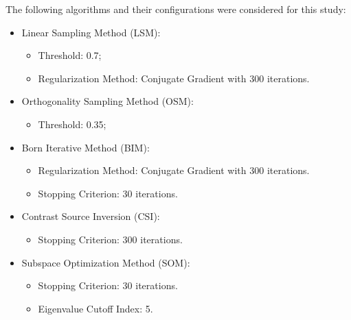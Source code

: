 \documentclass{IEEEtran}
\begin{document}
                The following algorithms and their configurations were considered for this study:
                \begin{itemize}
                    \item Linear Sampling Method (LSM):
                    \begin{itemize}
                        \item Threshold: 0.7;
                        \item Regularization Method: Conjugate Gradient with 300 iterations.
                    \end{itemize}
                    \item Orthogonality Sampling Method (OSM):
                    \begin{itemize}
                        \item Threshold: 0.35;
                    \end{itemize}
                    \item Born Iterative Method (BIM):
                    \begin{itemize}
                        \item Regularization Method: Conjugate Gradient with 300 iterations.
                        \item Stopping Criterion: 30 iterations.
                    \end{itemize}
                    \item Contrast Source Inversion (CSI):
                    \begin{itemize}
                        \item Stopping Criterion: 300 iterations.
                    \end{itemize}
                    \item Subspace Optimization Method (SOM):
                    \begin{itemize}
                        \item Stopping Criterion: 30 iterations.
                        \item Eigenvalue Cutoff Index: 5.
                    \end{itemize}
                \end{itemize}

\end{document}
